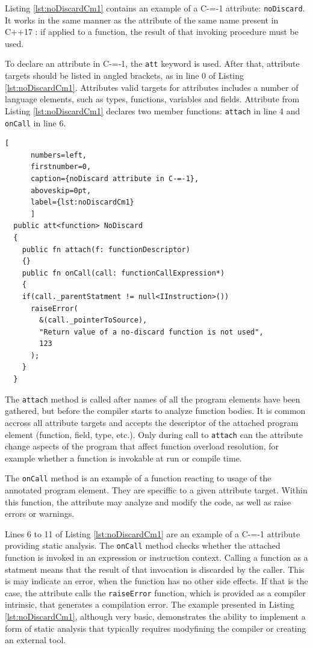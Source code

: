 Listing \ref{lst:noDiscardCm1} contains an example of a C-=-1 attribute: \lstinline{noDiscard}.
It works in the same manner as the attribute of the same name present in C++17 \cite{ISO:cpp17}: if applied to a function, the result of that invoking procedure must be used.

To declare an attribute in C-=-1, the \lstinline{att} keyword is used.
After that, attribute targets should be listed in angled brackets, as in line 0 of Listing \ref{lst:noDiscardCm1}.
Attributes valid targets for attributes includes a number of language elements, such as types, functions, variables and fields. Attribute from Listing \ref{lst:noDiscardCm1} declares two member functions: \lstinline{attach} in line 4 and \lstinline{onCall} in line 6.

\begin{minipage}{\linewidth}

	\begin{lstlisting}[
	  numbers=left,
	  firstnumber=0,
	  caption={noDiscard attribute in C-=-1},
	  aboveskip=0pt,
	  label={lst:noDiscardCm1}
	  ]
  public att<function> NoDiscard
  {
	public fn attach(f: functionDescriptor)
	{}
	public fn onCall(call: functionCallExpression*)
	{
	if(call._parentStatment != null<IInstruction>())
	  raiseError(
		&(call._pointerToSource),
		"Return value of a no-discard function is not used",
		123
	  );
	}
  }
  \end{lstlisting}
\end{minipage}

The \lstinline{attach} method is called after names of all the program elements have been gathered, but before the compiler starts to analyze function bodies.
It is common accross all attribute targets and accepts the descriptor of the attached program element (function, field, type, etc.).
Only during call to \lstinline{attach} can the attribute change aspects of the program that affect function overload resolution, for example
whether a function is invokable at run or compile time.

The \lstinline{onCall} method is an example of a function reacting to usage of the annotated program element.
They are speciffic to a given attribute target.
Within this function, the attribute may analyze and modify the code, as well as raise errors or warnings.

Lines 6 to 11 of Listing \ref{lst:noDiscardCm1} are an example of a C-=-1 attribute providing static analysis.
The \lstinline{onCall} method checks whether the attached function is invoked in an expression or instruction context.
Calling a function as a statment means that the result of that invocation is discarded by the caller.
This is may indicate an error, when the function has no other side effects.
If that is the case, the attribute calls the \lstinline{raiseError} function, which is provided as a compiler intrinsic, that generates a compilation error.
The example presented in Listing \ref{lst:noDiscardCm1}, although very basic, demonstrates the ability to implement a form of static analysis that typically requires modyfining the compiler or creating an external tool.

